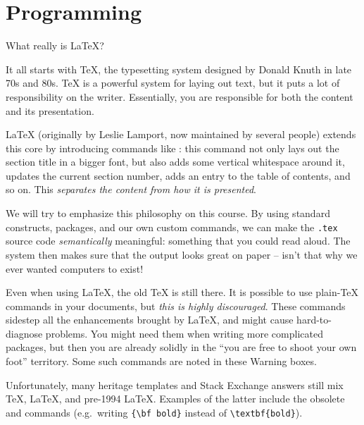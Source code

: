 
\chapter{Programming}

What really is \LaTeX?

It all starts with \TeX, the typesetting system designed by Donald Knuth in late 70s and 80s.
\TeX{} is a powerful system for laying out text,
but it puts a lot of responsibility on the writer.
Essentially, you are responsible for both the content and its presentation.

\LaTeX{} (originally by Leslie Lamport, now maintained by several people)
extends this core by introducing commands like :
this command not only lays out the section title in a bigger font,
but also adds some vertical whitespace around it, updates the current section number,
adds an entry to the table of contents, and so on.
This \emph{separates the content from how it is presented}.

We will try to emphasize this philosophy on this course.
By using standard constructs, packages, and our own custom commands,
we can make the \verb|.tex| source code \emph{semantically} meaningful:
something that you could read aloud.
The system then makes sure that the output looks great on paper
-- isn't that why we ever wanted computers to exist!


\begin{warning}
Even when using \LaTeX{}, the old \TeX{} is still there.
It is possible to use plain-\TeX{} commands in your documents,
but \emph{this is highly discouraged}.
These commands sidestep all the enhancements brought by \LaTeX,
and might cause hard-to-diagnose problems.
You might need them when writing more complicated packages,
but then you are already solidly in the ``you are free to shoot your own foot'' territory.
Some such commands are noted in these Warning boxes.

Unfortunately, many heritage templates and Stack Exchange answers still mix
\TeX{}, \LaTeX, and pre-1994 \LaTeX.
Examples of the latter include the obsolete  and  commands
(e.g.\ writing \verb|{\bf bold}| instead of \verb|\textbf{bold}|).
\end{warning}


